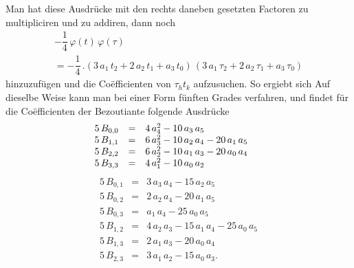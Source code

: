 Man hat diese Ausdrücke mit den rechts daneben gesetzten
Factoren zu multipliciren und zu addiren, dann noch
\[
\begin{array}{r}
-\dfrac{1}{4}\,\varphi(t)\,\varphi(\tau) \\[1ex]
= -\dfrac{1}{4}\,.(3\,a_1\,t_2 + 2\,a_2\,t_1 + a_3\,t_0)\,(3\,a_1\,\tau_2 + 2\,a_2\,\tau_1 + a_3\,\tau_0)
\end{array}
\]
hinzuzufügen und die Co\"efficienten von $\tau_h t_k$ aufzusuchen. So
ergiebt sich
Auf dieselbe Weise kann man bei einer Form fünften Grades
verfahren, und findet für die Co\"efficienten der Bezoutiante folgende Ausdrücke
\[
\begin{array}{rcl@{\qquad}rcl}
5\,B_{0,0} &=& 4\,a_4^2 - 10\,a_3\,a_5 \\
5\,B_{1,1} &=& 6\,a_3^2 - 10\,a_2\,a_4 - 20\,a_1\,a_5 \\
5\,B_{2,2} &=& 6\,a_2^2 - 10\,a_1\,a_3 - 20\,a_0\,a_4 \\
5\,B_{3,3} &=& 4\,a_1^2 - 10\,a_0\,a_2 \\
\end{array}
\]
\[
\begin{array}{rcl}
5\,B_{0,1} &=& 3\,a_3\,a_4 - 15\,a_2\,a_5 \\
5\,B_{0,2} &=& 2\,a_2\,a_4 - 20\,a_1\,a_5 \\
5\,B_{0,3} &=& a_1\,a_4 - 25\,a_0\,a_5 \\
5\,B_{1,2} &=& 4\,a_2\,a_3 - 15\,a_1\,a_4 - 25\,a_0\,a_5 \\
5\,B_{1,3} &=& 2\,a_1\,a_3 - 20\,a_0\,a_4 \\
5\,B_{2,3} &=& 3\,a_1\,a_2 - 15\,a_0\,a_3.
\end{array}
\]
